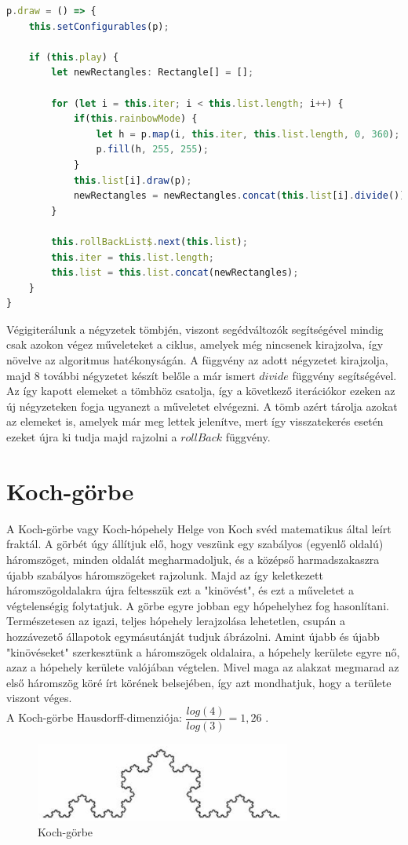 \begin{lstlisting}[language=typescript]
p.draw = () => {
	this.setConfigurables(p);

	if (this.play) {
		let newRectangles: Rectangle[] = [];
		
		for (let i = this.iter; i < this.list.length; i++) {
			if(this.rainbowMode) {
				let h = p.map(i, this.iter, this.list.length, 0, 360);
				p.fill(h, 255, 255);
			}
			this.list[i].draw(p);
			newRectangles = newRectangles.concat(this.list[i].divide());
		}
		
		this.rollBackList$.next(this.list);
		this.iter = this.list.length;
		this.list = this.list.concat(newRectangles);
	}
}
\end{lstlisting}
Végigiterálunk a négyzetek tömbjén, viszont segédváltozók segítségével mindig csak azokon végez műveleteket a ciklus, amelyek még nincsenek kirajzolva, így növelve az algoritmus hatékonyságán. A függvény az adott négyzetet kirajzolja, majd 8 további négyzetet készít belőle a már ismert $divide$ függvény segítségével. Az így kapott elemeket a tömbhöz csatolja, így a következő iterációkor ezeken az új négyzeteken fogja ugyanezt a műveletet elvégezni. A tömb azért tárolja azokat az elemeket is, amelyek már meg lettek jelenítve, mert így visszatekerés esetén ezeket újra ki tudja majd rajzolni a $rollBack$ függvény.

	
\section{Koch-görbe}
A Koch-görbe vagy Koch-hópehely Helge von Koch svéd matematikus által leírt fraktál. A görbét úgy állítjuk elő, hogy veszünk egy szabályos (egyenlő oldalú) háromszöget, minden oldalát megharmadoljuk, és a középső harmadszakaszra újabb szabályos háromszögeket rajzolunk. Majd az így keletkezett háromszögoldalakra újra feltesszük ezt a "kinövést", és ezt a műveletet a végtelenségig folytatjuk. A görbe egyre jobban egy hópehelyhez fog hasonlítani. Természetesen az igazi, teljes hópehely lerajzolása lehetetlen, csupán a hozzávezető állapotok egymásutánját tudjuk ábrázolni. Amint újabb és újabb "kinövéseket" szerkesztünk a háromszögek oldalaira, a hópehely kerülete egyre nő, azaz a hópehely kerülete valójában végtelen. Mivel maga az alakzat megmarad az első háromszög köré írt körének belsejében, így azt mondhatjuk, hogy a területe viszont véges.\\
A Koch-görbe Hausdorff-dimenziója: $\dfrac{log(4)}{log(3)} = 1,26$ \cite{koch-gorbe-wiki}.
\begin{figure}[!ht]
	\begin{center}
		\includegraphics[width=0.75\textwidth]{img/KochCurve}
		\caption[labelInTOC]{Koch-görbe}
	\end{center}
\end{figure}

